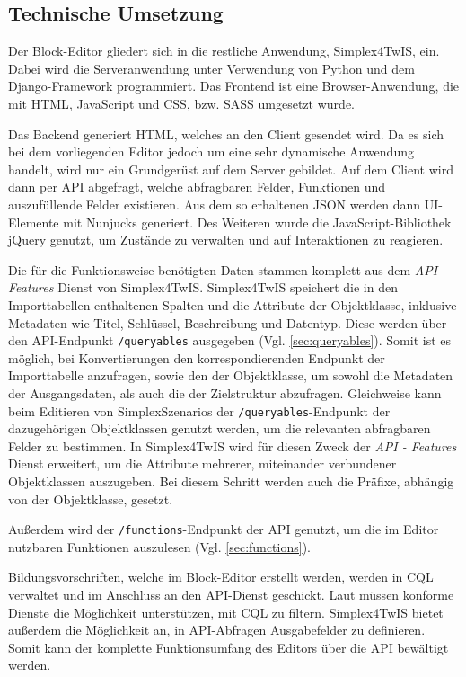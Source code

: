 \subsection{Technische Umsetzung}
Der Block-Editor gliedert sich in die restliche Anwendung, Simplex4TwIS, ein. Dabei wird die Serveranwendung unter Verwendung von Python und dem Django-Framework \parencite{djangosoftwarefoundationDjango} programmiert. Das Frontend ist eine Browser-Anwendung, die mit \ac{HTML}, JavaScript und \ac{CSS}, bzw. \ac{SASS} umgesetzt wurde.

Das Backend generiert \ac{HTML}, welches an den Client gesendet wird. Da es sich bei dem vorliegenden Editor jedoch um eine sehr dynamische Anwendung handelt, wird nur ein Grundgerüst auf dem Server gebildet. Auf dem Client wird dann per \ac{API} abgefragt, welche abfragbaren Felder, Funktionen und auszufüllende Felder existieren. Aus dem so erhaltenen \ac{JSON} werden dann UI-Elemente mit Nunjucks \parencite{mozillaNunjucks} generiert. Des Weiteren wurde die JavaScript-Bibliothek jQuery \parencite{openjsfoundationJQuery} genutzt, um Zustände zu verwalten und auf Interaktionen zu reagieren.

Die für die Funktionsweise benötigten Daten stammen komplett aus dem \textit{API - Features} Dienst \parencite{ogcAPI} von Simplex4TwIS. Simplex4TwIS speichert die in den Importtabellen enthaltenen Spalten und die Attribute der Objektklasse, inklusive Metadaten wie Titel, Schlüssel, Beschreibung und Datentyp. Diese werden über den \ac{API}-Endpunkt \texttt{/queryables} ausgegeben (Vgl. \ref{sec:queryables}). Somit ist es möglich, bei Konvertierungen den korrespondierenden Endpunkt der Importtabelle anzufragen, sowie den der Objektklasse, um sowohl die Metadaten der Ausgangsdaten, als auch die der Zielstruktur abzufragen. Gleichweise kann beim Editieren von SimplexSzenarios der \texttt{/queryables}-Endpunkt der dazugehörigen Objektklassen genutzt werden, um die relevanten abfragbaren Felder zu bestimmen. In Simplex4TwIS wird für diesen Zweck der \textit{API - Features} Dienst erweitert, um die Attribute mehrerer, miteinander verbundener Objektklassen auszugeben. Bei diesem Schritt werden auch die Präfixe, abhängig von der Objektklasse, gesetzt.

Außerdem wird der \texttt{/functions}-Endpunkt der \ac{API} genutzt, um die im Editor nutzbaren Funktionen auszulesen (Vgl. \ref{sec:functions}).

Bildungsvorschriften, welche im Block-Editor erstellt werden, werden in \ac{CQL} verwaltet und im Anschluss an den \ac{API}-Dienst geschickt. Laut  müssen konforme Dienste die Möglichkeit unterstützen, mit \ac{CQL} zu filtern. Simplex4TwIS bietet außerdem die Möglichkeit an, in \ac{API}-Abfragen Ausgabefelder zu definieren. Somit kann der komplette Funktionsumfang des Editors über die \ac{API} bewältigt werden.

